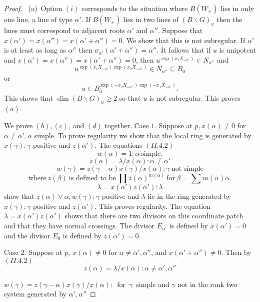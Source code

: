 \documentclass{memo-l}
\theoremstyle{definition}
\theoremstyle{remark}
\numberwithin{section}{chapter}
\numberwithin{equation}{chapter}
\begin{document}
\begin{proof} \ (a)\ Option $(i)$ corresponds to the situation where
$B(W_{+})$ lies in only one line, a line of type ${\alpha}'$.  If
$B(W_{+})$ lies in two lines of $(B\backslash G)_{u}$ then the lines must
correspond to adjacent roots ${\alpha}'$ and ${\alpha}''$.  Suppose that
$x({\alpha}')  =  x({\alpha}'')  =  x({\alpha}'+{\alpha}'')  =  0$.  We show that this is
not subregular.  If ${\alpha}'$ is at least as long as ${\alpha}''$ then
${\sigma}_{{\alpha}'}({\alpha}'+{\alpha}'')  =  {\alpha}''$.  It follows that if
$u$ is unipotent and $x({\alpha}')  =  x({\alpha''})  =  x({\alpha}'+{\alpha''})  =  0$,
then $u^{\exp(x_{1}X_{-{\alpha}'})} \in N_{{\alpha}''}$ and
$$
u^{\exp(x_{1}X_{-{\alpha}'})\exp(x_{2}X_{-{\alpha}''})} \in
N_{{\alpha}''} {\subseteq} B_{0}
$$
or 
$$
u \in B_{0}^ { \exp(-x_{2}X_{-{\alpha}''}) \exp(-x_{1}X_{-{\alpha}'}) }.
$$
This shows that $\dim(B\backslash G)_{u} \ge 2$ so that $u$ is not
subregular.  This proves $(a)$.

   We prove $(b),(c)$, and $(d)$ together.  Case $1$.  Suppose at $p,
x({\alpha})\ne 0$ for ${\alpha} \ne {\alpha}', {\alpha}$ simple.  To prove
regularity we show that the local ring is generated by 
$x({\gamma}): {\gamma}$ positive and $z({\alpha}')$.  The equations $(II.4.2)$
$$
w({\alpha})  =  1 : {\alpha}\ {\text{simple}}.
$$
$$
z({\alpha})  =  {\lambda}/x({\alpha}) : {\alpha} \ne {\alpha}'
$$
$$
w({\gamma})  =  z({\gamma}-{\alpha})x({\gamma})/x({\alpha}) : {\gamma}\ 
{\text{not\ simple}}
$$
$$
{\text{where}}\ z({\beta})\ {\text{is\ defined\ to\ be}}\ \prod
z({\alpha})^{m({\alpha})}\ {\text{for}}\  {\beta}  =  \sum m({\alpha}){\alpha}.
$$
$$
{\lambda}  =  x({\alpha}')z({\alpha}') : {\lambda}
$$
show that $z({\alpha}) {\ \forall\ } {\alpha}, w({\gamma}) : {\gamma}$
positive and ${\lambda}$ lie in the ring generated by $x({\gamma}) :
{\gamma}$ positive and $z({\alpha}')$.  This proves regularity.  The
equation ${\lambda}  =  x({\alpha}')z({\alpha}')$ shows that there are two
divisors on this coordinate patch and that they have normal crossings.  The
divisor $E_{{\alpha}'}$ is defined by $x({\alpha}')  =  0$ and the divisor
$E_{0}$ is defined by $z({\alpha}')  =  0$.

   Case $2$.  Suppose at $p,\  x({\alpha}) \ne 0$ for ${\alpha} \ne
{\alpha}',{\alpha''}$, and $x({\alpha}'+{\alpha''}) \ne 0$.  Then by $(II.4.2)$
$$
z({\alpha})  =  {\lambda}/x({\alpha}) : {\alpha} \ne {\alpha}',{\alpha''}
$$

$w({\gamma})  =  z({\gamma}-{\alpha})x({\gamma})/x({\alpha}):$\ for\ ${\gamma}$\
simple and ${\gamma}$ not in the rank two system generated by 
${\alpha}', {\alpha}''$


\end{proof}
\end{document}
